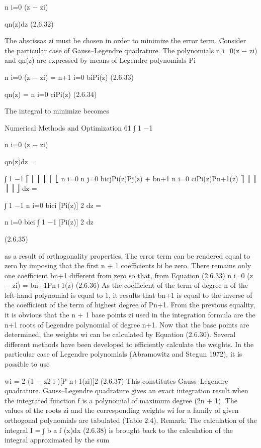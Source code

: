 \documentclass[letterpaper,12pt]{article}
\begin{document}
n
i=0
(z − zi)

qn(z)dz (2.6.32)

The abscissas zi must be chosen in order to minimize the error term.
Consider the particular case of Gauss–Legendre quadrature. The polynomials
n
i=0(z − zi) and qn(z) are expressed by means of Legendre polynomials Pi

n
i=0
(z − zi) =
n+1
i=0
biPi(z) (2.6.33)

qn(z) =
n
i=0
ciPi(z) (2.6.34)

The integral to minimize becomes

Numerical Methods and Optimization 61
∫ 1
−1

n
i=0
(z − zi)

qn(z)dz =

∫ 1
−1
⎡
⎢
⎢
⎢
⎢
⎣
n
i=0
n
j=0
bicjPi(z)Pj(z) + bn+1
n
i=0
ciPi(z)Pn+1(z)
⎤
⎥
⎥
⎥
⎥
⎦
dz =

∫ 1
−1
n
i=0
bici [Pi(z)]
2 dz =

n
i=0
bici
∫ 1
−1
[Pi(z)]
2 dz

(2.6.35)

as a result of orthogonality properties.
The error term can be rendered equal to zero by imposing that the first n + 1
coefficients bi be zero. There remains only one coefficient bn+1 different from zero so
that, from Equation (2.6.33)
n
i=0
(z − zi) = bn+1Pn+1(z) (2.6.36)
As the coefficient of the term of degree n of the left-hand polynomial is equal to 1, it
results that bn+1 is equal to the inverse of the coefficient of the term of highest degree
of Pn+1.
From the previous equality, it is obvious that the n + 1 base points zi used in the
integration formula are the n+1 roots of Legendre polynomial of degree n+1. Now that
the base points are determined, the weights wi can be calculated by Equation (2.6.30).
Several different methods have been developed to efficiently calculate the weights.
In the particular case of Legendre polynomials (Abramowitz and Stegun 1972), it is
possible to use

wi = 2
(1 − z2
i )[P
n+1(zi)]2 (2.6.37)
This constitutes Gauss–Legendre quadrature. Gauss–Legendre quadrature gives an
exact integration result when the integrated function f is a polynomial of maximum
degree (2n + 1).
The values of the roots zi and the corresponding weights wi for a family of given
orthogonal polynomials are tabulated (Table 2.4).
Remark:
The calculation of the integral
I =
∫ b
a
f (x)dx (2.6.38)
is brought back to the calculation of the integral approximated by the sum
\end{document}
